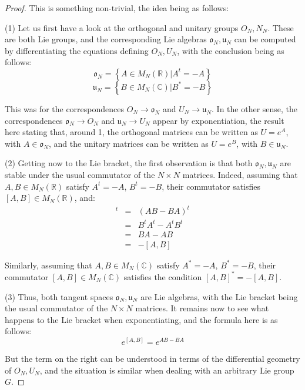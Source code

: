 \documentclass[12pt]{amsbook}
\begin{document}
\begin{proof}
This is something non-trivial, the idea being as follows:

\medskip

(1) Let us first have a look at the orthogonal and unitary groups $O_N,N_N$. These are both Lie groups, and the corresponding Lie algebras $\mathfrak o_N,\mathfrak u_N$ can be computed by differentiating the equations defining $O_N,U_N$, with the conclusion being as follows:
$$\mathfrak o_N=\left\{ A\in M_N(\mathbb R)\Big|A^t=-A\right\}$$
$$\mathfrak u_N=\left\{ B\in M_N(\mathbb C)\Big|B^*=-B\right\}$$

This was for the correspondences $O_N\to\mathfrak o_N$ and $U_N\to\mathfrak u_N$. In the other sense, the correspondences $\mathfrak o_N\to O_N$ and $\mathfrak u_N\to U_N$ appear by exponentiation, the result here stating that, around 1, the orthogonal matrices can be written as $U=e^A$, with $A\in\mathfrak o_N$, and the unitary matrices can be written as $U=e^B$, with $B\in\mathfrak u_N$.

\medskip

(2) Getting now to the Lie bracket, the first observation is that both $\mathfrak o_N,\mathfrak u_N$ are stable under the usual commutator of the $N\times N$ matrices. Indeed, assuming that $A,B\in M_N(\mathbb R)$ satisfy $A^t=-A$, $B^t=-B$, their commutator satisfies $[A,B]\in M_N(\mathbb R)$, and:
\begin{eqnarray*}
[A,B]^t
&=&(AB-BA)^t\\
&=&B^tA^t-A^tB^t\\
&=&BA-AB\\
&=&-[A,B]
\end{eqnarray*}

Similarly, assuming that $A,B\in M_N(\mathbb C)$ satisfy $A^*=-A$, $B^*=-B$, their commutator $[A,B]\in M_N(\mathbb C)$ satisfies the condition $[A,B]^*=-[A,B]$.

\medskip

(3) Thus, both tangent spaces $\mathfrak o_N,\mathfrak u_N$ are Lie algebras, with the Lie bracket being the usual commutator of the $N\times N$ matrices. It remains now to see what happens to the Lie bracket when exponentiating, and the formula here is as follows:
$$e^{[A,B]}=e^{AB-BA}$$

But the term on the right can be understood in terms of the differential geometry of $O_N,U_N$, and the situation is similar when dealing with an arbitrary Lie group $G$.
\end{proof}
\end{document}
